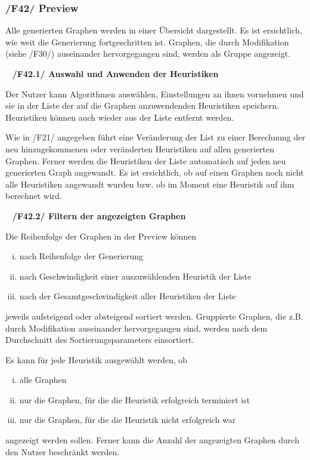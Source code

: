 \documentclass{article}
\begin{document}
	\subsubsection*{/F42/ Preview} \label{f42} 
	Alle generierten Graphen werden in einer Übersicht dargestellt. Es ist ersichtlich, wie weit die Generierung fortgeschritten ist. Graphen, die durch Modifikation (siehe /F30/) auseinander hervorgegangen sind, werden als Gruppe angezeigt.
	
	~\newline
	\textbf{/F42.1/ Auswahl und Anwenden der Heuristiken}
	
	Der Nutzer kann Algorithmen auswählen, Einstellungen an ihnen vornehmen und sie in der Liste der auf die Graphen anzuwendenden Heuristiken speichern. Heuristiken können auch wieder aus der Liste entfernt werden. 
	
	Wie in /F21/ angegeben führt eine Veränderung der List zu einer Berechnung der neu hinzugekommenen oder veränderten Heuristiken auf allen generierten Graphen. Ferner werden die Heuristiken der Liste automatisch auf jeden neu generierten Graph angewandt.
	Es ist ersichtlich, ob auf einen Graphen noch nicht alle Heuristiken angewandt wurden bzw. ob im Moment eine Heuristik auf ihm berechnet wird.
	
	~\newline
	\textbf{/F42.2/ Filtern der angezeigten Graphen}
	
	Die Reihenfolge der Graphen in der Preview können
	\begin{enumerate}[i)]
		\item{nach Reihenfolge der Generierung}
		\item{nach Geschwindigkeit einer auszuwählenden Heuristik der Liste}
		\item{nach der Gesamtgeschwindigkeit aller Heuristiken der Liste}
	\end{enumerate}
	jeweils aufsteigend oder absteigend sortiert werden.
	Gruppierte Graphen, die z.B. durch Modifikation auseinander hervorgegangen sind, werden nach dem Durchschnitt des Sortierungsparameters einsortiert.
	
	Es kann für jede Heuristik ausgewählt werden, ob
	\begin{enumerate}[i)]
		\item{alle Graphen}
		\item{nur die Graphen, für die die Heuristik erfolgreich terminiert ist}
		\item{nur die Graphen, für die die Heuristik nicht erfolgreich war}
	\end{enumerate}
	angezeigt werden sollen. Ferner kann die Anzahl der angezeigten Graphen durch den Nutzer beschränkt werden.
	
\end{document}
